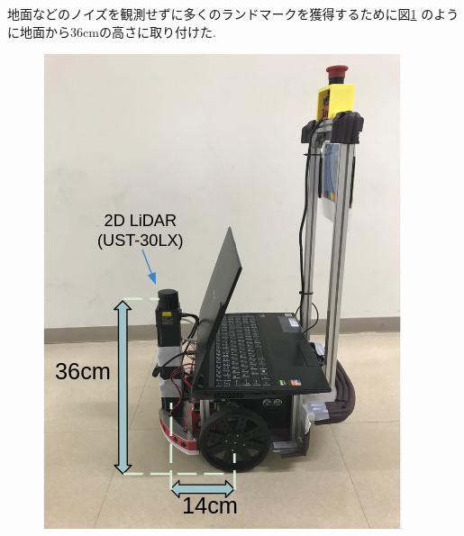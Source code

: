 地面などのノイズを観測せずに多くのランドマークを獲得するために図\ref{fig:raspicat-lidar}
のように地面から36cmの高さに取り付けた.

\begin{figure}[H]
	\begin{center}
		\includegraphics[width=0.5\linewidth]{figs/raspicat-lidar.png}
		\caption{}
		\label{fig:raspicat-lidar}
	\end{center}
\end{figure}